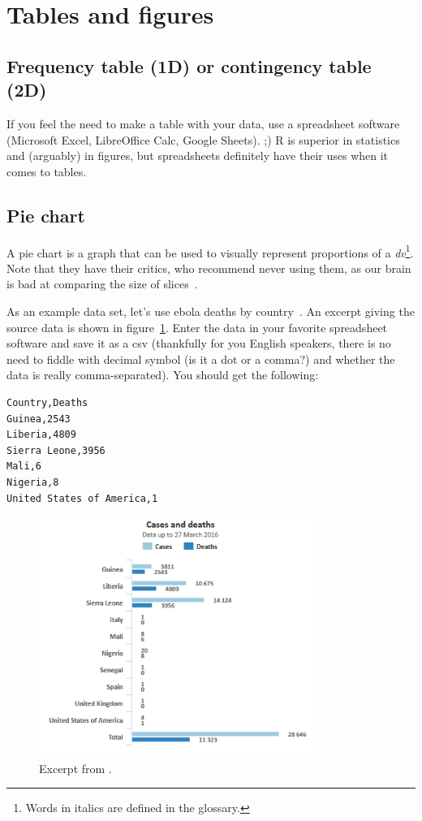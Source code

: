 \documentclass{report}
\begin{document}
	\section{Tables and figures}
		\subsection{Frequency table (1D) or contingency table (2D)}
		If you feel the need to make a table with your data, use a spreadsheet software (Microsoft Excel, LibreOffice Calc, Google Sheets).  ;) R is superior in statistics and (arguably) in figures, but spreadsheets definitely have their uses when it comes to tables.
	
		\subsection{Pie chart}
		A pie chart is a graph that can be used to visually represent proportions of a \emph{\gls{dv}}\footnote{Words in italics are defined in the glossary.}. Note that they have their critics, who recommend never using them, as our brain is bad at comparing the size of slices~\cite{wiki_pie}.
	
		As an example data set, let's use ebola deaths by country~\cite{who}. An excerpt giving the source data is shown in figure~\ref{fig:ebola}. Enter the data in your favorite spreadsheet software and save it as a csv (thankfully for you English speakers, there is no need to fiddle with decimal symbol (is it a dot or a comma?) and whether the data is really comma-separated). You should get the following:
		\begin{verbatim}
Country,Deaths
Guinea,2543
Liberia,4809
Sierra Leone,3956
Mali,6
Nigeria,8
United States of America,1
		\end{verbatim}
		\begin{figure}[h]
			\centering
			\includegraphics[width=0.8\textwidth]{ebola.png}
			\caption{Excerpt from \cite{who}.}
			\label{fig:ebola}
		\end{figure}
\end{document}
